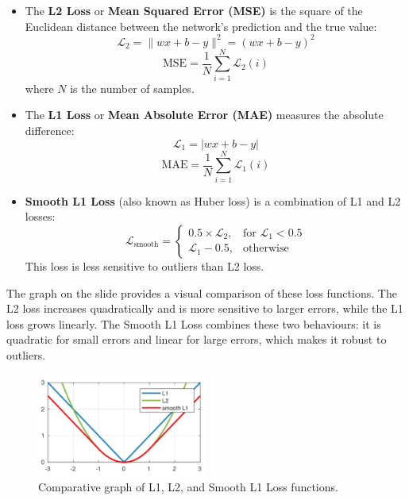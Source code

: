 \begin{itemize}
    \item The \textbf{L2 Loss} or \textbf{Mean Squared Error (MSE)} is the square of the Euclidean distance between the network's prediction and the true value:
    \[ \mathcal{L}_2 = \lVert wx + b - y \rVert^2 = (wx + b - y)^2 \]
    \[ \text{MSE} = \frac{1}{N} \sum_{i=1}^{N} \mathcal{L}_2(i) \]
    where \( N \) is the number of samples.

    \item The \textbf{L1 Loss} or \textbf{Mean Absolute Error (MAE)} measures the absolute difference:
    \[ \mathcal{L}_1 = \lvert wx + b - y \rvert \]
    \[ \text{MAE} = \frac{1}{N} \sum_{i=1}^{N} \mathcal{L}_1(i) \]

    \item \textbf{Smooth L1 Loss} (also known as Huber loss) is a combination of L1 and L2 losses:
    \[ \mathcal{L}_{\text{smooth}} = \begin{cases} 
    0.5 \times \mathcal{L}_2, & \text{for } \mathcal{L}_1 < 0.5 \\
    \mathcal{L}_1 - 0.5, & \text{otherwise}
    \end{cases} \]
    This loss is less sensitive to outliers than L2 loss.
\end{itemize}

The graph on the slide provides a visual comparison of these loss functions. The L2 loss increases quadratically and is more sensitive to larger errors, while the L1 loss grows linearly. The Smooth L1 Loss combines these two behaviours: it is quadratic for small errors and linear for large errors, which makes it robust to outliers.

\begin{figure}[H]
\centering
\includegraphics[width=0.5\textwidth]{img/l1_l2.png}
\caption{Comparative graph of L1, L2, and Smooth L1 Loss functions.}
\end{figure}

